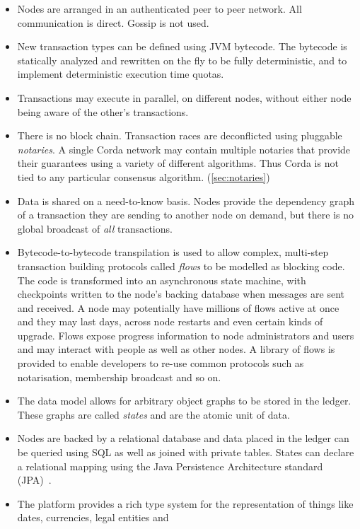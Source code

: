 \documentclass{article}
\begin{document}
\begin{itemize}
\item Nodes are arranged in an authenticated peer to peer network. All communication is direct. Gossip is not used.
\item New transaction types can be defined using JVM\cite{JVM} bytecode. The bytecode is statically analyzed and rewritten
on the fly to be fully deterministic, and to implement deterministic execution time quotas.
\item Transactions may execute in parallel, on different nodes, without either node being aware of the other's transactions.
\item There is no block chain\cite{Bitcoin}. Transaction races are deconflicted using pluggable \emph{notaries}. A single
Corda network may contain multiple notaries that provide their guarantees using a variety of different algorithms. Thus
Corda is not tied to any particular consensus algorithm. (\cref{sec:notaries})
\item Data is shared on a need-to-know basis. Nodes provide the dependency graph of a transaction they are sending to
another node on demand, but there is no global broadcast of \emph{all} transactions.
\item Bytecode-to-bytecode transpilation is used to allow complex, multi-step transaction building protocols called
\emph{flows} to be modelled as blocking code. The code is transformed into an asynchronous state machine, with
checkpoints written to the node's backing database when messages are sent and received. A node may potentially have
millions of flows active at once and they may last days, across node restarts and even certain kinds of upgrade. Flows expose progress
information to node administrators and users and may interact with people as well as other nodes. A library of flows is provided
to enable developers to re-use common protocols such as notarisation, membership broadcast and so on.
\item The data model allows for arbitrary object graphs to be stored in the ledger. These graphs are called \emph{states} and are the atomic unit of data.
\item Nodes are backed by a relational database and data placed in the ledger can be queried using SQL as well as joined
with private tables. States can declare a relational mapping using the Java Persistence Architecture standard (JPA)~\cite{JPA}.
\item The platform provides a rich type system for the representation of things like dates, currencies, legal entities and

\end{itemize}
\end{document}

